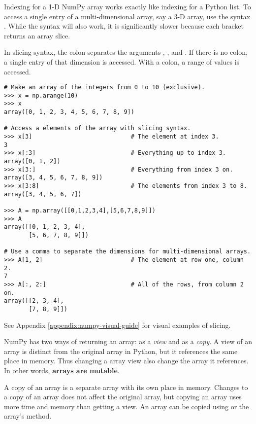 Indexing for a 1-D NumPy array works exactly like indexing for a Python list.
To access a single entry of a multi-dimensional array, say a 3-D array, use the syntax .
While the syntax  will also work, it is significantly slower because each bracket returns an array slice.

In slicing syntax, the colon \li{:} separates the arguments , , and .
If there is no colon, a single entry of that dimension is accessed.
With a colon, a range of values is accessed.

\begin{lstlisting}
# Make an array of the integers from 0 to 10 (exclusive).
>>> x = np.arange(10)
>>> x
array([0, 1, 2, 3, 4, 5, 6, 7, 8, 9])

# Access a elements of the array with slicing syntax.
>>> x[3]                            # The element at index 3.
3
>>> x[:3]                           # Everything up to index 3.
array([0, 1, 2])
>>> x[3:]                           # Everything from index 3 on.
array([3, 4, 5, 6, 7, 8, 9])
>>> x[3:8]                          # The elements from index 3 to 8.
array([3, 4, 5, 6, 7])

>>> A = np.array([[0,1,2,3,4],[5,6,7,8,9]])
>>> A
array([[0, 1, 2, 3, 4],
       [5, 6, 7, 8, 9]])

# Use a comma to separate the dimensions for multi-dimensional arrays.
>>> A[1, 2]                         # The element at row one, column 2.
7
>>> A[:, 2:]                        # All of the rows, from column 2 on.
array([[2, 3, 4],
       [7, 8, 9]])
\end{lstlisting}

See Appendix \ref{appendix:numpy-visual-guide} for visual examples of slicing.

\begin{info} %
NumPy has two ways of returning an array: as a \emph{view} and as a \emph{copy}.
A view of an array is distinct from the original array in Python, but it references the same place in memory.
Thus changing a array view also change the array it references.
In other words, \textbf{arrays are mutable}.

A copy of an array is a separate array with its own place in memory.
Changes to a copy of an array does not affect the original array, but copying an array uses more time and memory than getting a view.
An array can be copied using  or the array's  method.
\end{info}

